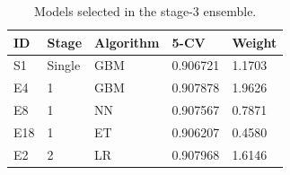 \begin{table}
\begin{center}
	\caption{Models selected in the stage-3 ensemble.}
\begin{tabular}{lllll}
ID 	& Stage 	& Algorithm 	& 5-CV 		& Weight\\ \hline
S1 	& Single	& GBM		& 0.906721 	& 1.1703 \\
E4 	& 1 		& GBM		& 0.907878 	& 1.9626\\
E8 	& 1 		& NN		& 0.907567	& 0.7871\\
E18	& 1		& ET			& 0.906207 	& 0.4580\\
E2	& 2 		& LR			& 0.907968 	& 1.6146\\
\end{tabular}

\label{tb:finalEnsemble}
\end{center}
\end{table}
